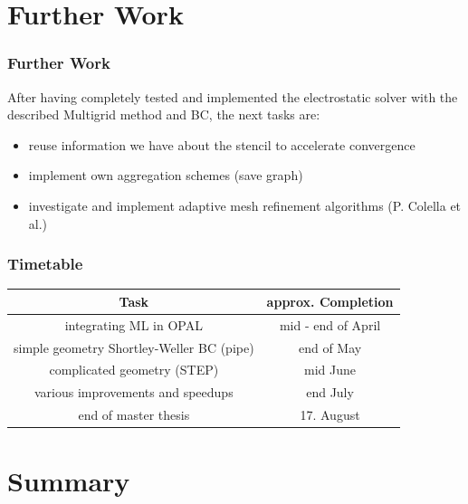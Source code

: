 \documentclass[xcolor=pdftex,table,10pt]{beamer}
\begin{document}
    \section{Further Work}

    	\begin{frame}
		\frametitle{Further Work}

		After having completely tested and implemented the electrostatic solver with the described Multigrid method and BC, the next tasks are:

		\vspace{0.5cm}

		\begin{itemize}
			\item reuse information we have about the stencil to accelerate convergence
			\item implement own aggregation schemes (save graph)
			\item investigate and implement adaptive mesh refinement algorithms (P. Colella et al.)
		\end{itemize}

	\end{frame}
    	
	\begin{frame}
		\frametitle{Timetable}

	                \begin{center}
                        \begin{tabular}{|c|c|}
                        \hline
                        Task & approx. Completion \\
                        \hline
                        integrating ML in OPAL & mid - end of April \\
                        simple geometry Shortley-Weller BC (pipe) & end of May \\
                        complicated geometry (STEP) & mid June \\
			various improvements and speedups & end July \\
			end of master thesis & 17. August \\
                        \hline
                        \end{tabular}
	                \end{center}
	

	\end{frame}

     \section{Summary}
\end{document}

